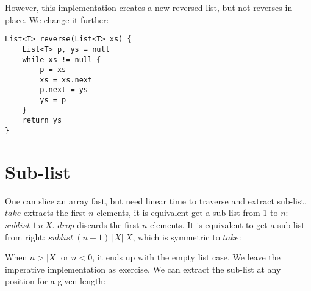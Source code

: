\documentclass[b5paper]{article}
\begin{document}
However, this implementation creates a new reversed list, but not reverses in-place. We change it further:

\begin{lstlisting}[language=Bourbaki]
List<T> reverse(List<T> xs) {
    List<T> p, ys = null
    while xs != null {
        p = xs
        xs = xs.next
        p.next = ys
        ys = p
    }
    return ys
}
\end{lstlisting}

\begin{Exercise}
\end{Exercise}

\section{Sub-list}
   
One can slice an array fast, but need linear time to traverse and extract sub-list. $take$ extracts the first $n$ elements, it is equivalent get a sub-list from 1 to $n$: $sublist\ 1\ n\ X$. $drop$ discards the first $n$ elements. It is equivalent to get a sub-list from right: $sublist\ (n+1)\ |X|\ X$, which is symmetric to $take$:

\be
{}
\ee

When $n > |X|$ or $n < 0$, it ends up with the empty list case. We leave the imperative implementation as exercise. We can extract the sub-list at any position for a given length:
\end{document}
